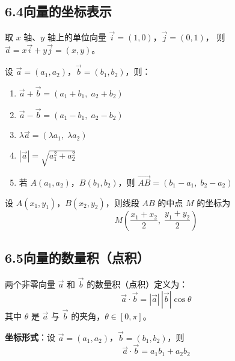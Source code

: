 \documentclass[12pt, a4paper]{ctexart}
\begin{document}
\subsection*{6.4\quad 向量的坐标表示}

\begin{knowledgebox}[平面向量的坐标运算]
取 $x$ 轴、$y$ 轴上的单位向量 $\vec{i}=(1,0)$，$\vec{j}=(0,1)$，
则 $\vec{a} = x\vec{i} + y\vec{j} = (x, y)$。

\medskip
设 $\vec{a} = (a_1, a_2)$，$\vec{b} = (b_1, b_2)$，则：
\begin{enumerate}[leftmargin=2em]
  \item $\vec{a} + \vec{b} = (a_1 + b_1,\; a_2 + b_2)$
  \item $\vec{a} - \vec{b} = (a_1 - b_1,\; a_2 - b_2)$
  \item $\lambda\vec{a} = (\lambda a_1,\; \lambda a_2)$
  \item $|\vec{a}| = \sqrt{a_1^2 + a_2^2}$
  \item 若 $A(a_1,a_2)$，$B(b_1,b_2)$，则 $\overrightarrow{AB} = (b_1 - a_1,\; b_2 - a_2)$
\end{enumerate}
\end{knowledgebox}

\begin{tipbox}[中点坐标公式]
设 $A(x_1,y_1)$，$B(x_2,y_2)$，则线段 $AB$ 的中点 $M$ 的坐标为
\[
M\!\left(\frac{x_1+x_2}{2},\; \frac{y_1+y_2}{2}\right)
\]
\end{tipbox}

\subsection*{6.5\quad 向量的数量积（点积）}

\begin{knowledgebox}[数量积的定义]
两个非零向量 $\vec{a}$ 和 $\vec{b}$ 的数量积（点积）定义为：
\[
\vec{a} \cdot \vec{b} = |\vec{a}|\,|\vec{b}|\cos\theta
\]
其中 $\theta$ 是 $\vec{a}$ 与 $\vec{b}$ 的夹角，$\theta \in [0, \pi]$。

\medskip
\textbf{坐标形式}：设 $\vec{a}=(a_1,a_2)$，$\vec{b}=(b_1,b_2)$，则
\[
\vec{a} \cdot \vec{b} = a_1 b_1 + a_2 b_2
\]
\end{knowledgebox}
\end{document}
